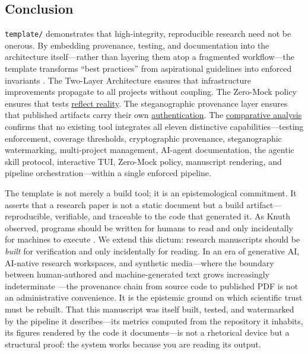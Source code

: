 \documentclass[
]{article}
\begin{document}
\subsection{Conclusion}\label{conclusion}

\texttt{template/} demonstrates that high-integrity, reproducible
research need not be onerous. By embedding provenance, testing, and
documentation into the architecture itself---rather than layering them
atop a fragmented workflow---the template transforms ``best practices''
from aspirational guidelines into enforced invariants
\citep{wilson2017good, sandve2013ten, lamprecht2020towards}. The
Two-Layer Architecture ensures that infrastructure improvements
propagate to all projects without coupling. The Zero-Mock policy ensures
that tests
\href{05a_zeromock_tradeoff.md\#the-zero-mock-tradeoff}{reflect
reality}. The steganographic provenance layer ensures that published
artifacts carry their own
\href{07_security_provenance.md\#security-and-provenance}{authentication}.
The \href{08f_appendix_matrix.md\#appendix-matrix}{comparative analysis}
confirms that no existing tool integrates all eleven distinctive
capabilities---testing enforcement, coverage thresholds, cryptographic
provenance, steganographic watermarking, multi-project management,
AI-agent documentation, the agentic skill protocol, interactive TUI,
Zero-Mock policy, manuscript rendering, and pipeline
orchestration---within a single enforced pipeline.

The template is not merely a build tool; it is an epistemological
commitment. It asserts that a research paper is not a static document
but a build artifact---reproducible, verifiable, and traceable to the
code that generated it. As Knuth observed, programs should be written
for humans to read and only incidentally for machines to execute
\citep{knuth1984literate}. We extend this dictum: research manuscripts
should be \emph{built} for verification and only incidentally for
reading. In an era of generative AI, AI-native research workspaces, and
synthetic media---where the boundary between human-authored and
machine-generated text grows increasingly indeterminate
\citep{gruenpeter2021research}---the provenance chain from source code
to published PDF is not an administrative convenience. It is the
epistemic ground on which scientific trust must be rebuilt. That this
manuscript was itself built, tested, and watermarked by the pipeline it
describes---its metrics computed from the repository it inhabits, its
figures rendered by the code it documents---is not a rhetorical device
but a structural proof: the system works because you are reading its
output.
\end{document}
